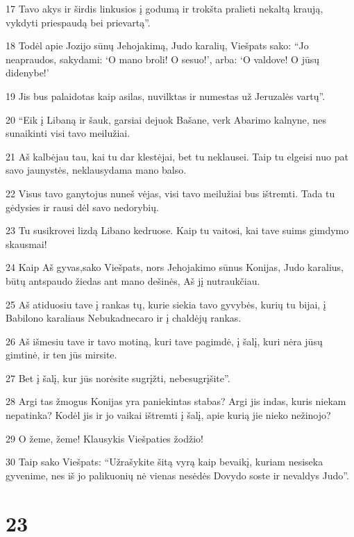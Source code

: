 \par 17 Tavo akys ir širdis linkusios į godumą ir trokšta pralieti nekaltą kraują, vykdyti priespaudą bei prievartą”. 
\par 18 Todėl apie Jozijo sūnų Jehojakimą, Judo karalių, Viešpats sako: “Jo neapraudos, sakydami: ‘O mano broli! O sesuo!’, arba: ‘O valdove! O jūsų didenybe!’ 
\par 19 Jis bus palaidotas kaip asilas, nuvilktas ir numestas už Jeruzalės vartų”. 
\par 20 “Eik į Libaną ir šauk, garsiai dejuok Bašane, verk Abarimo kalnyne, nes sunaikinti visi tavo meilužiai. 
\par 21 Aš kalbėjau tau, kai tu dar klestėjai, bet tu neklausei. Taip tu elgeisi nuo pat savo jaunystės, neklausydama mano balso. 
\par 22 Visus tavo ganytojus nuneš vėjas, visi tavo meilužiai bus ištremti. Tada tu gėdysies ir rausi dėl savo nedorybių. 
\par 23 Tu susikrovei lizdą Libano kedruose. Kaip tu vaitosi, kai tave suims gimdymo skausmai! 
\par 24 Kaip Aš gyvas,­sako Viešpats,­ nors Jehojakimo sūnus Konijas, Judo karalius, būtų antspaudo žiedas ant mano dešinės, Aš jį nutraukčiau. 
\par 25 Aš atiduosiu tave į rankas tų, kurie siekia tavo gyvybės, kurių tu bijai, į Babilono karaliaus Nebukadnecaro ir į chaldėjų rankas. 
\par 26 Aš išmesiu tave ir tavo motiną, kuri tave pagimdė, į šalį, kuri nėra jūsų gimtinė, ir ten jūs mirsite. 
\par 27 Bet į šalį, kur jūs norėsite sugrįžti, nebesugrįšite”. 
\par 28 Argi tas žmogus Konijas yra paniekintas stabas? Argi jis indas, kuris niekam nepatinka? Kodėl jis ir jo vaikai ištremti į šalį, apie kurią jie nieko nežinojo? 
\par 29 O žeme, žeme! Klausykis Viešpaties žodžio! 
\par 30 Taip sako Viešpats: “Užrašykite šitą vyrą kaip bevaikį, kuriam nesiseka gyvenime, nes iš jo palikuonių nė vienas nesėdės Dovydo soste ir nevaldys Judo”.



\chapter{23}


